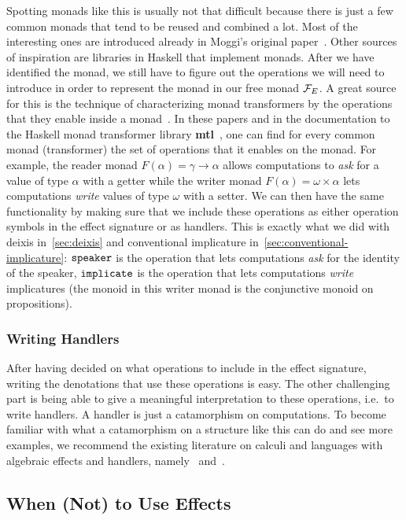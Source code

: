 Spotting monads like this is usually not that difficult because there is
just a few common monads that tend to be reused and combined a lot. Most of
the interesting ones are introduced already in Moggi's original
paper~\cite{moggi1991notions}. Other sources of inspiration are libraries
in Haskell that implement monads. After we have identified the monad, we
still have to figure out the operations we will need to introduce in order
to represent the monad in our free monad $\mathcal{F}_E$. A great source for this
is the technique of characterizing monad transformers by the operations
that they enable inside a
monad~\cite{jones1995functional,liang1995monad}. In these papers and in the
documentation to the Haskell monad transformer library
\textbf{mtl}~\cite{mtl}, one can find for every common monad (transformer)
the set of operations that it enables on the monad. For example, the reader
monad $F(\alpha) = \gamma \to \alpha$ allows computations to \emph{ask} for
a value of type $\alpha$ with a getter while the writer monad
$F(\alpha) = \omega \times \alpha$ lets computations \emph{write} values of
type $\omega$ with a setter. We can then have the same functionality by
making sure that we include these operations as either operation symbols in
the effect signature or as handlers. This is exactly what we did with
deixis in~\ref{sec:deixis} and conventional implicature
in~\ref{sec:conventional-implicature}: $\mathtt{speaker}$ is the operation that
lets computations \emph{ask} for the identity of the speaker,
$\mathtt{implicate}$ is the operation that lets computations \emph{write}
implicatures (the monoid in this writer monad is the conjunctive monoid on
propositions).


\subsubsection{Writing Handlers}

After having decided on what operations to include in the effect signature,
writing the denotations that use these operations is easy. The other
challenging part is being able to give a meaningful interpretation to these
operations, i.e.\ to write handlers. A handler is just a catamorphism on
computations. To become familiar with what a catamorphism on a structure
like this can do and see more examples, we recommend the existing
literature on calculi and languages with algebraic effects and handlers,
namely~\cite{bauer2012programming} and~\cite{kammar2013handlers}.


\subsection{When (Not) to Use Effects}
\label{ssec:when-to-use-effects}

